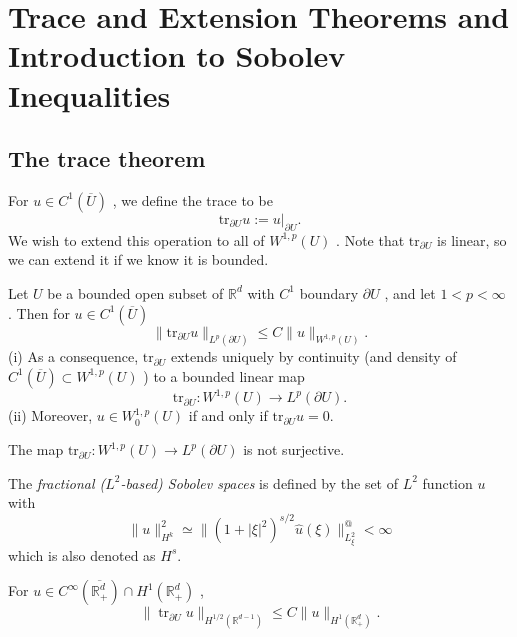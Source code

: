 \section{Trace and Extension Theorems and Introduction to Sobolev Inequalities}
\subsection{The trace theorem}
\begin{definition}
For \(u\in C^{1}(\overline{U})\) , we define the trace to be
\[
\mathrm{tr}_{\partial U}u:= u|_{\partial U}.
\]
We wish to extend this operation to all of \(W^{1,p}(U)\) . Note that \(\mathrm{tr}_{\partial U}\) is linear, so we can extend it if we know it is bounded.
\end{definition}

\begin{theorem}
Let \(U\) be a bounded open subset of \(\mathbb{R}^{d}\) with \(C^{1}\) boundary \(\partial U\) , and let \(1< p< \infty\) . Then for \(u\in C^{1}(\overline{U})\)
\[
\| \mathrm{tr}_{\partial U}u\|_{L^p (\partial U)}\leq C\| u\|_{W^{1,p}(U)}.
\]
(i) As a consequence, \(\mathrm{tr}_{\partial U}\) extends uniquely by continuity (and density of \(C^{1}(\overline{U})\subset W^{1,p}(U)\) ) to a bounded linear map
\[
\mathrm{tr}_{\partial U}:W^{1,p}(U)\to L^p (\partial U).
\]
(ii) Moreover, \(u\in W_{0}^{1,p}(U)\) if and only if \(\mathrm{tr}_{\partial U}u = 0\).
\end{theorem}

\begin{remark}
    The map \(\mathrm{tr}_{\partial U}:W^{1,p}(U)\to L^{p}(\partial U)\) is not surjective.
\end{remark}

\begin{definition}
    The \emph{fractional ($L^2$-based) Sobolev spaces} is defined by the set of $L^2$ function $u$ with
    \[
    \lVert u\rVert_{H^k}^2 \simeq \lVert(1+|\xi|^2)^{s/2}\hat{u}(\xi)\rVert^@_{L^2_{\xi}} < \infty
    \]
    which is also denoted as $H^s$.
\end{definition}

\begin{theorem}
For \(u \in C^{\infty}(\overline{\mathbb{R}_{+}^{d}}) \cap H^{1}(\mathbb{R}_{+}^{d})\) ,
\[
\| \operatorname {tr}_{\partial U}u\|_{H^{1 / 2}(\mathbb{R}^{d - 1})}\leq C\| u\|_{H^{1}(\mathbb{R}_{+}^{d})}.
\]
\end{theorem}

